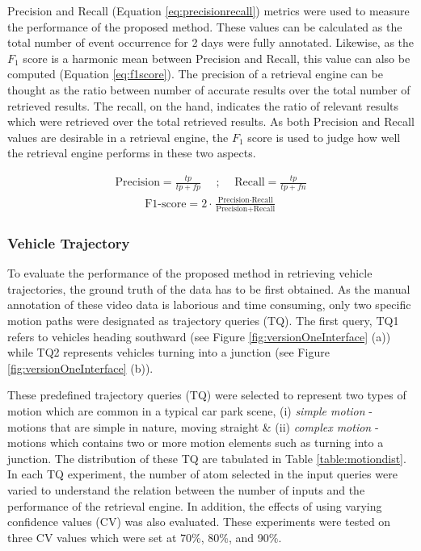 Precision and Recall (Equation \ref{eq:precisionrecall}) metrics were used to
measure the performance of the proposed method. These values can be calculated
as the total number of event occurrence for 2 days were fully annotated.
Likewise, as the $F_1$ score is a harmonic mean between Precision and Recall,
this value can also be computed (Equation \ref{eq:f1score}). The precision of a
retrieval engine can be thought as the ratio between number of accurate results
over the total number of retrieved results. The recall, on the hand, indicates
the ratio of relevant results which were retrieved over the total retrieved
results. As both Precision and Recall values are desirable in a retrieval
engine, the $F_1$ score is used to judge how well the retrieval engine performs
in these two aspects.

\begin{align}
\label{eq:precisionrecall}
    \text{Precision} = \frac{tp}{tp + fp}   \hspace{1em} \text{ ; }  \hspace{1em} \text{Recall}  = \frac{tp}{tp + fn}
\end{align}
\begin{align}
\label{eq:f1score}
\text{F1-score}  = 2\cdot\frac{\text{Precision} \cdot \text{Recall}}{\text{Precision} + \text{Recall}}
\end{align}


\subsubsection{Vehicle Trajectory}

To evaluate the performance of the proposed method in retrieving vehicle
trajectories, the ground truth of the data has to be first obtained. As the
manual annotation of these video data is laborious and time consuming, only
two specific motion paths were designated as trajectory queries (TQ). The first
query, TQ1 refers to vehicles heading southward (see Figure
\ref{fig:versionOneInterface} (a)) while TQ2 represents vehicles turning into
a junction (see Figure \ref{fig:versionOneInterface} (b)).

These predefined trajectory queries (TQ) were selected to represent two types
of motion which are common in a typical car park scene, (i) \textit{simple
motion} - motions that are simple in nature, moving straight \& (ii)
\textit{complex motion} - motions which contains two or more motion elements
such as turning into a junction. The distribution of these TQ are tabulated in
Table \ref{table:motiondist}. In each TQ experiment, the number of atom selected
in the input queries were varied to understand the relation between the number
of inputs and the performance of the retrieval engine. In addition, the effects
of using varying confidence values (CV) was also evaluated. These experiments
were tested on three CV values which were set at 70\%, 80\%, and 90\%.


